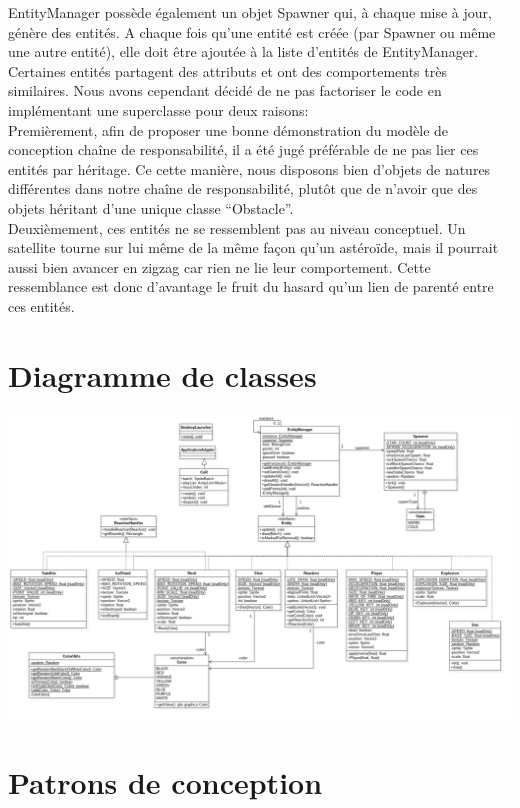\documentclass[11pt,a4paper,twoside,svgnames]{article}
\begin{document}
EntityManager possède également un objet Spawner qui, à chaque mise à jour, génère des entités. A chaque fois qu'une entité est créée (par Spawner ou même une autre entité), elle doit être ajoutée à la liste d'entités de EntityManager.\\

Certaines entités partagent des attributs et ont des comportements très similaires. Nous avons cependant décidé de ne pas factoriser le code en implémentant une superclasse pour deux raisons:\\

Premièrement, afin de proposer une bonne démonstration du modèle de conception chaîne de responsabilité, il a été jugé préférable de ne pas lier ces entités par héritage. Ce cette manière, nous disposons bien d'objets de natures différentes dans notre chaîne de responsabilité, plutôt que de n'avoir que des objets héritant d'une unique classe ``Obstacle''.\\

Deuxièmement, ces entités ne se ressemblent pas au niveau conceptuel. Un satellite tourne sur lui même de la même façon qu'un astéroïde, mais il pourrait aussi bien avancer en zigzag car rien ne lie leur comportement. Cette ressemblance est donc d'avantage le fruit du hasard qu'un lien de parenté entre ces entités.
\section{Diagramme de classes}

\includegraphics[width=\paperwidth,height=\paperheight,keepaspectratio,angle=90,origin=c]{uml_cor.jpg}

\clearpage

\section{Patrons de conception}
\end{document}
